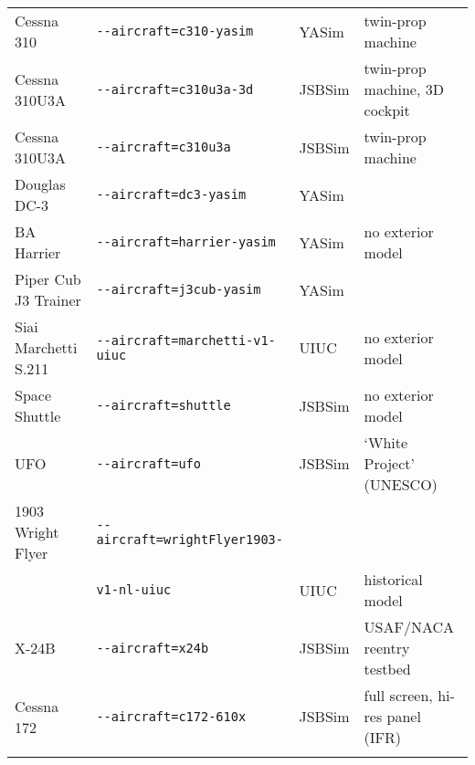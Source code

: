 \begin{tabular}{l|l|l|l}
   Cessna 310					&		\texttt{-$ $-aircraft=c310-yasim}                  
   &  YASim &  twin-prop machine         \\
   Cessna 310U3A &		\texttt{-$ $-aircraft=c310u3a-3d}                  
   & JSBSim &  twin-prop machine, 3D cockpit         \\
   Cessna 310U3A			&		\texttt{-$ $-aircraft=c310u3a}                     
   & JSBSim &  twin-prop machine         \\
   Douglas DC-3	  		&		\texttt{-$ $-aircraft=dc3-yasim}                   
   &  YASim &           \\
   BA Harrier	&		\texttt{-$ $-aircraft=harrier-yasim}               
   &  YASim & no exterior model         \\
   Piper Cub J3 Trainer				&		\texttt{-$ $-aircraft=j3cub-yasim}                 
   &  YASim &           \\
   Siai Marchetti S.211			&		\texttt{-$ $-aircraft=marchetti-v1-uiuc}           
   &  UIUC & no exterior model          \\
   Space Shuttle					&		\texttt{-$ $-aircraft=shuttle}                     
   & JSBSim & no exterior model          \\
   UFO 	&		\texttt{-$ $-aircraft=ufo}               
   & JSBSim & `White Project' (UNESCO)            \\
   1903 Wright Flyer					&		\texttt{-$ $-aircraft=wrightFlyer1903-}  
   & &          \\
   					&		\texttt{v1-nl-uiuc}  
   & UIUC & historical model          \\
      X-24B	&		\texttt{-$ $-aircraft=x24b}                        
   & JSBSim & USAF/NACA reentry testbed          \\
   Cessna 172  &	\texttt{-$ $-aircraft=c172-610x}         
   & JSBSim & full screen, hi-res panel (IFR)          \\
   \\
\end{tabular}

